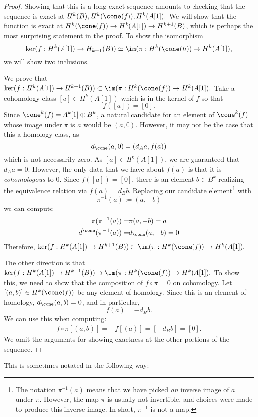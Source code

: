 \begin{proof}
Showing that this is a long exact sequence amounts to checking that the sequence is exact at $H^k(B), H^k(\cone(f)),H^k(A[1]).$
We will show that the function is exact at $H^k(\cone(f))\to H^k(A[1])\to H^{k+1}(B)$, which is perhaps the most surprising statement in the proof. 
To show the isomorphism 
\[\ker(f: H^k(A[1])\to H_{k+1}(B))\simeq \im( \pi: H^k(\cone(h))\to H^k(A[1]),\]
we will show two inclusions. 

We prove that $\ker(f: H^k(A[1])\to H^{k+1}(B))\subset \im( \pi: H^k(\cone(f))\to H^k(A[1]).$ Take a cohomology class $[a]\in H^k(A[1])$ which is in the kernel of $f$ so that
\[f([a])=[0].\] 
Since $\cone^k(f)=A^k[1]\oplus B^k$, a natural candidate for an element of $\cone^k(f)$ whose image under $\pi$ is $a$ would be $(a, 0)$. 
However, it may not be the case that this a homology class, as 
\[d_{\cone}(a, 0)=( d_A a, f(a))\]
which is not necessarily zero. 
As $[a]\in H^k(A[1])$, we are guaranteed that $d_A a=0$. However, the only data that we have about $f(a)$ is that it is \emph{cohomologous} to $0$. Since $f([a])=[0]$, there is an element $b\in B^k$ realizing the equivalence relation via  $f(a)=d_B b$. Replacing our candidate element\footnote{The notation $\pi^{-1}(a)$ means that we have picked \emph{an} inverse image of $a$ under $\pi$. 
However, the map $\pi$ is usually not invertible, and choices were made to produce this inverse image. In short, $\pi^{-1}$ is not a map.} with 
\[\pi^{-1}(a):= (a, -b)\]
we can compute 
\begin{align*}
\pi (\pi^{-1}(a))= &\pi(a, -b) = a\\
d^{\cone}( \pi^{-1}(a) )=& d_{\cone} (a, -b) = 0
\end{align*}
Therefore, $\ker(f: H^k(A[1])\to H^{k+1}(B))\subset \im( \pi: H^k(\cone(f))\to H^k(A[1]).$

The other direction is that $\ker(f: H^k(A[1])\to H^{k+1}(B))\supset \im( \pi: H^k(\cone(f))\to H^k(A[1]).$ To show this, we need to show that the composition of $f\circ \pi=0$ on cohomology. 
Let $[(a, b)]\in H^k(\cone(f))$ be any element of homology. 
Since this is an element of homology, $d_{\cone}(a, b)=0$, and in particular,
\[f(a)= - d_B b. \]
We can use this when computing:
\begin{align*}
f\circ \pi[(a, b)] =& f[(a)]=[-d_B b ]=[0].
\end{align*}
We omit the arguments for showing exactness at the other portions of the sequence.
\end{proof}
This is sometimes notated in the following way:
